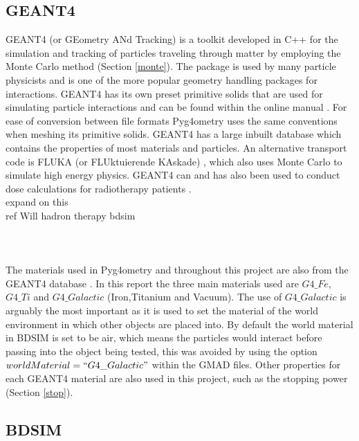 \documentclass[12pt,a4paper]{article}
\begin{document}
\subsection{GEANT4}\label{GEANT4}
\label{g4}
GEANT4 (or GEometry ANd Tracking) is a toolkit developed in C++ for the simulation and tracking of particles traveling through matter by employing the Monte Carlo method (Section \ref{monte}). The package is used by many particle physicists and is one of the more popular
 geometry handling packages for interactions. GEANT4 has its own preset primitive solids that are used for simulating particle interactions and can be found within the online manual \cite{solids}. For ease of conversion between file formats 
 Pyg4ometry uses the same conventions when meshing its primitive solids. GEANT4 has a large inbuilt database which contains the properties of most materials and particles. An alternative transport code is FLUKA (or FLUktuierende KAskade)
 , which also uses Monte Carlo to simulate high energy physics. GEANT4 can and has also been used to conduct dose calculations for radiotherapy patients \cite{dose}.\\
 expand on this\\
 ref Will hadron therapy bdsim\\
 \\
\\\\
The materials used in Pyg4ometry and throughout this project are also from the GEANT4 database \cite{mater}. In this report the three main materials used are
 $G4\_Fe$, $G4\_Ti$ and $G4\_Galactic$ (Iron,Titanium and Vacuum). The use of $G4\_Galactic$ is arguably the most important as it is used to set the material of the world environment in which other objects are placed into.
  By default the world material in BDSIM is set to be air, which means the particles would interact before passing into the object being tested, this was avoided by using the option $worldMaterial=``G4\_Galactic"$ within the GMAD files. Other properties for each GEANT4 material are also used in this project, such as the stopping power (Section \ref{stop}). 

\subsection{BDSIM}
\label{bdsim}
\end{document}
